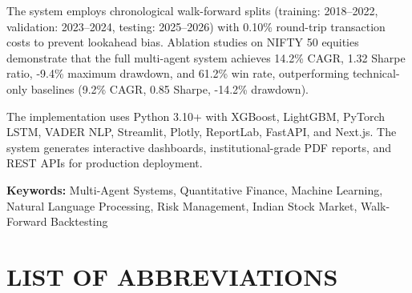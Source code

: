 \documentclass[12pt,a4paper]{report}
\begin{document}
The system employs chronological walk-forward splits (training: 2018--2022, validation: 2023--2024, testing: 2025--2026) with 0.10\% round-trip transaction costs to prevent lookahead bias. Ablation studies on NIFTY 50 equities demonstrate that the full multi-agent system achieves 14.2\% CAGR, 1.32 Sharpe ratio, -9.4\% maximum drawdown, and 61.2\% win rate, outperforming technical-only baselines (9.2\% CAGR, 0.85 Sharpe, -14.2\% drawdown).

The implementation uses Python 3.10+ with XGBoost, LightGBM, PyTorch LSTM, VADER NLP, Streamlit, Plotly, ReportLab, FastAPI, and Next.js. The system generates interactive dashboards, institutional-grade PDF reports, and REST APIs for production deployment.

\vspace{1cm}
\noindent \textbf{Keywords:} Multi-Agent Systems, Quantitative Finance, Machine Learning, Natural Language Processing, Risk Management, Indian Stock Market, Walk-Forward Backtesting

\newpage
\tableofcontents

\newpage
\listoffigures
{}

\newpage
\listoftables
{}

\newpage
\chapter*{LIST OF ABBREVIATIONS}
\end{document}
